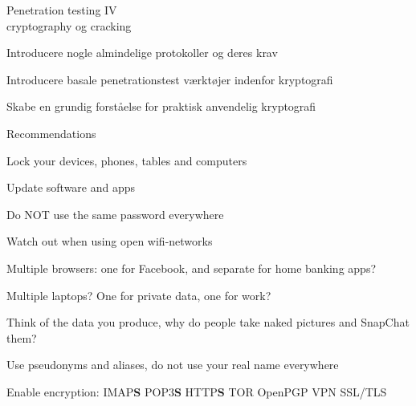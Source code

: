 \documentclass[20pt,landscape,a4paper,footrule]{foils}
\begin{document}

\mytitlepage
{Penetration testing IV\\cryptography og cracking}




\LogoOn





\begin{list1}
\item Introducere nogle almindelige protokoller og deres krav
\item Introducere basale penetrationstest værktøjer indenfor kryptografi
\item Skabe en grundig forståelse for praktisk anvendelig kryptografi
\end{list1}


Recommendations 
\begin{list2}
\item Lock your devices, phones, tables and computers
\item Update software and apps
\item Do NOT use the same password everywhere
\item Watch out when using open wifi-networks
\item Multiple browsers: one for Facebook, and separate for home banking apps?
\item Multiple laptops? One for private data, one for work?
\item Think of the data you produce, why do people take naked pictures and SnapChat them?
\item Use pseudonyms and aliases, do not use your real name everywhere
\item Enable encryption: IMAP{\bf S} POP3{\bf S}
  HTTP{\bf S} TOR OpenPGP VPN SSL/TLS
\end{list2}




\end{document}
